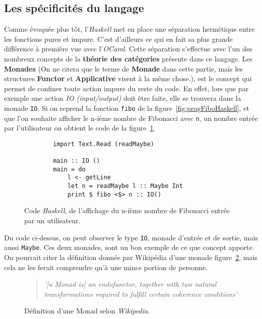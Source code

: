 \subsection{Les spécificités du langage}

Comme évoquée plus tôt, l'\textit{Haskell} met en place une séparation 
hermétique entre les fonctions pures et impure. C'est d'ailleurs ce qui en fait 
sa plus grande différence à première vue avec l'\textit{OCaml}. Cette séparation
s'effectue avec l'un des nombreux concepts de la \textbf{théorie des catégories}
présente dans ce langage. Les \textbf{Monades} (On ne citera que le terme de 
\textbf{Monade} dans cette partie, mais les structures \textbf{Functor} et 
\textbf{Applicative} visent à la même chose.), est le concept qui permet de 
confiner toute action impure du reste du code. En effet, lors que par exemple 
une action \textit{IO (input/output)} doit être faite, elle se trouvera dans la 
monade \texttt{IO}. Si on reprend la fonction 
\texttt{fibo} de la figure~\ref{fig:progFiboHaskell}, et que l'on 
souhaite afficher le n-ième nombre de Fibonacci avec \texttt{n}, un 
nombre entrée par l'utilisateur on obtient le code de la 
figure~\ref{fig:progInOutFibo}.

\begin{figure}[H]
    \begin{verbatim}
        import Text.Read (readMaybe)
        
        main :: IO ()
        main = do
            l <- getLine
            let n = readMaybe l :: Maybe Int
            print $ fibo <$> n :: IO()
    \end{verbatim}
    \caption{
        Code \textit{Haskell}, de l'affichage du n-ième nombre de Fibonacci
        entrée par un utilisateur.
    }\label{fig:progInOutFibo}
\end{figure}

Du code ci-dessus, on peut observer le type \texttt{IO}, monade 
d'entrée et de sortie, mais aussi \texttt{Maybe}. Ces deux monades,
sont un bon exemple de ce que concept apporte. On pourrait citer la définition 
donnée par Wikipédia d'une monade figure~\ref{fig:citationMonad}, mais cela ne 
les ferait comprendre qu'à une mince portion de personne.

\begin{figure}[H]
    \begin{quotation}
        \textit{'[a Monad is] an endofunctor, together with two natural 
        transformations required to fulfill certain coherence conditions'
        }\cite{citationMonadWiki}
    \caption{
      Définition d'une Monad selon \textit{Wikipedia}.
    }\label{fig:citationMonad}
    \end{quotation}
\end{figure}

